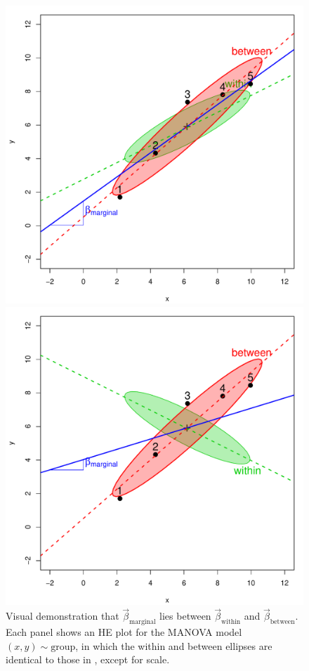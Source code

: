 \begin{figure}[htb]
 \begin{minipage}[b]{.49\linewidth}
  \centering
  \includegraphics[width=1\linewidth]{fig/between-HE1}
 \end{minipage}%
 \hfill
 \begin{minipage}[b]{.49\linewidth}
  \centering
  \includegraphics[width=1\linewidth]{fig/between-HE2}
 \end{minipage}
  \caption{Visual demonstration that $\vec{\beta}_{\textrm{marginal}}$ lies between $\vec{\beta}_{\textrm{within}}$ and $\vec{\beta}_{\textrm{between}}$.
  Each panel shows an HE plot for the MANOVA model $(x, y) \sim \textrm{group}$, in which the within and between ellipses are identical to
  those in , except for scale.}
  \label{fig:between-HE}
\end{figure}

